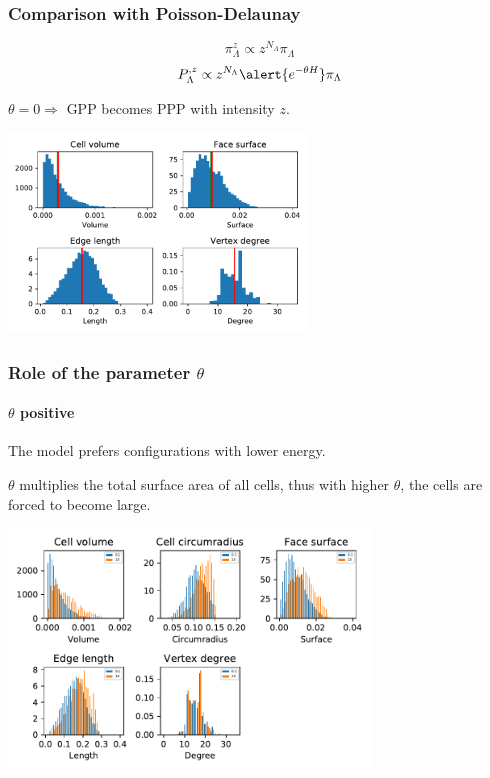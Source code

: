 \documentclass[c, 10pt]{beamer}
\begin{document}
 
\begin{frame}\frametitle{Comparison with Poisson-Delaunay}
$$ \pi_\Lambda^z \propto z^{N_\Lambda} \pi_\Lambda$$
\vspace{-4mm}
$$ P^{, z}_\Lambda \propto z^{N_\Lambda} \alert{ e^{-\theta H}} \pi_\Lambda $$
\begin{small}$\theta = 0 \Rightarrow$ GPP becomes PPP with intensity $z$.\end{small}
\begin{center}
\includegraphics[height = 5.3cm]{./FigureLayout/facets_Poisson.pdf}
\end{center}
\end{frame}




\begin{frame}\frametitle{Role of the parameter $\theta$}\framesubtitle{$\theta$ positive}

\begin{small}
The model prefers configurations with lower energy.

$\theta$ multiplies the total surface area of all cells, thus with higher $\theta$, the cells are forced to become large. 
\end{small}
\begin{center}
\includegraphics[height = 6.4cm]{./FigureLayout/facets_extr.pdf}
\end{center}

\end{frame}
\end{document}
